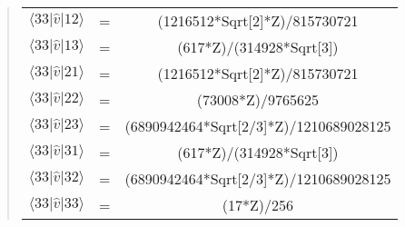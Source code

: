 \documentclass[%
oneside,                 %
final,                   %
10pt]{article}
\newenvironment{doconceexercise}{}{}
\begin{document}
\begin{doconceexercise}
\begin{quote}
\begin{tabular}{ccc}
$\langle 33\vert \hat{v} \vert 12\rangle$ & = & (1216512*Sqrt[2]*Z)/815730721          \\
$\langle 33\vert \hat{v} \vert 13\rangle$ & = & (617*Z)/(314928*Sqrt[3])               \\
$\langle 33\vert \hat{v} \vert 21\rangle$ & = & (1216512*Sqrt[2]*Z)/815730721          \\
$\langle 33\vert \hat{v} \vert 22\rangle$ & = & (73008*Z)/9765625                      \\
$\langle 33\vert \hat{v} \vert 23\rangle$ & = & (6890942464*Sqrt[2/3]*Z)/1210689028125 \\
$\langle 33\vert \hat{v} \vert 31\rangle$ & = & (617*Z)/(314928*Sqrt[3])               \\
$\langle 33\vert \hat{v} \vert 32\rangle$ & = & (6890942464*Sqrt[2/3]*Z)/1210689028125 \\
$\langle 33\vert \hat{v} \vert 33\rangle$ & = & (17*Z)/256                             \\
\hline
\end{tabular}
\end{quote}

\noindent

\end{doconceexercise}




\printindex
\end{document}
